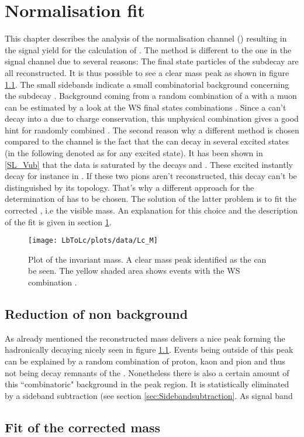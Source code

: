 \chapter{Normalisation fit}
\label{sec:Normalisationfit}

This chapter describes the analysis of the normalisation channel \LbToLcmunu (\LcTopKpi) resulting in the signal yield \NLc for the calculation of \R. The method is different to the one in the signal channel \LbToDpmunuX due to several reasons:
The final state particles of the subdecay \LcTopKpi are all reconstructed. 
It is thus possible to see a clear \Lc mass peak as shown in figure \ref{fig:plot_Lc_M}.
The small sidebands indicate a small combinatorial background concerning the subdecay \LcTopKpi.
Background coming from a random combination of a \Lc with a muon can be estimated by a look at the WS final states combinations \Lc\mup.
Since a \Lb can't decay into a \Lc\mup due to charge conservation, this unphysical combination gives a good hint for randomly combined \Lc\mun.
The second reason why a different method is chosen compared to the \LbToDpmunuX channel is the fact that the \Lb can decay in several excited \Lc states (in the following denoted as \Lcstar for any excited \Lc state).
It has been shown in \ref{SL_Vub} that the \LbToLcmunu data is saturated by the decays  and .
These excited \Lcstar instantly decay for instance in \Lc\pip\pim. 
If these two pions aren't reconstructed, this decay can't be distinguished by its topology.
That's why a different approach for the determination of \NLc has to be chosen.
The solution of the latter problem is to fit the corrected \pKpi\mun, i.e the visible \Lb mass.
An explanation for this choice and the description of the fit is given in section \ref{sec:Normalisationfit}.
\begin{figure}[hptb]
    \centering
	\texttt{[image: LbToLc/plots/data/Lc\_M]}	
	\caption{Plot of the invariant \pKpi mass. A clear mass peak identified as the \Lc can be seen. The yellow shaded area shows events with the WS combination \Lc\mup.}
	\label{fig:plot_Lc_M}
\end{figure}

\section{Reduction of non \Lc background}
As already mentioned the reconstructed \pKpi mass delivers a nice peak forming the hadronically decaying \Lc nicely seen in figure \ref{fig:plot_Lc_M}. 
Events being outside of this peak can be explained by a random combination of proton, kaon and pion and thus not being decay remnants of the \Lc.
Nonetheless there is also a certain amount of this ``combinatoric" background in the peak region.
It is statistically eliminated by a sideband subtraction (see section \ref{sec:Sidebandsubtraction}.
As signal band

\section{Fit of the \pKpi\mun corrected mass}
\label{sec:FitCorrectedMass}
